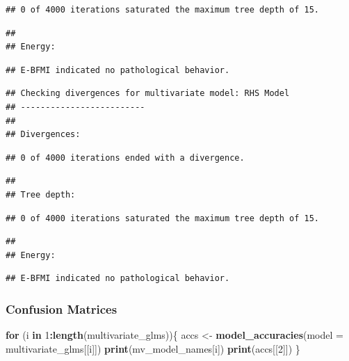 \documentclass[
]{article}
\newenvironment{Shaded}{\begin{snugshade}}{\end{snugshade}}
\newcommand{\ControlFlowTok}[1]{\textcolor[rgb]{0.13,0.29,0.53}{\textbf{#1}}}
\newcommand{\DataTypeTok}[1]{\textcolor[rgb]{0.13,0.29,0.53}{#1}}
\newcommand{\DecValTok}[1]{\textcolor[rgb]{0.00,0.00,0.81}{#1}}
\newcommand{\KeywordTok}[1]{\textcolor[rgb]{0.13,0.29,0.53}{\textbf{#1}}}
\newcommand{\NormalTok}[1]{#1}
\newcommand{\OperatorTok}[1]{\textcolor[rgb]{0.81,0.36,0.00}{\textbf{#1}}}
\newcommand{\StringTok}[1]{\textcolor[rgb]{0.31,0.60,0.02}{#1}}
\begin{document}
\begin{verbatim}
## 0 of 4000 iterations saturated the maximum tree depth of 15.
\end{verbatim}

\begin{verbatim}
## 
## Energy:
\end{verbatim}

\begin{verbatim}
## E-BFMI indicated no pathological behavior.
\end{verbatim}

\begin{verbatim}
## Checking divergences for multivariate model: RHS Model 
## -------------------------
## 
## Divergences:
\end{verbatim}

\begin{verbatim}
## 0 of 4000 iterations ended with a divergence.
\end{verbatim}

\begin{verbatim}
## 
## Tree depth:
\end{verbatim}

\begin{verbatim}
## 0 of 4000 iterations saturated the maximum tree depth of 15.
\end{verbatim}

\begin{verbatim}
## 
## Energy:
\end{verbatim}

\begin{verbatim}
## E-BFMI indicated no pathological behavior.
\end{verbatim}

\hypertarget{confusion-matrices}{%
\subsubsection{Confusion Matrices}\label{confusion-matrices}}

\begin{Shaded}
\begin{Highlighting}[]
\ControlFlowTok{for}\NormalTok{ (i }\ControlFlowTok{in} \DecValTok{1}\OperatorTok{:}\KeywordTok{length}\NormalTok{(multivariate_glms))\{}
\NormalTok{  accs <-}\StringTok{ }\KeywordTok{model_accuracies}\NormalTok{(}\DataTypeTok{model =}\NormalTok{ multivariate_glms[[i]])}
  \KeywordTok{print}\NormalTok{(mv_model_names[i])}
  \KeywordTok{print}\NormalTok{(accs[[}\DecValTok{2}\NormalTok{]])}
\NormalTok{\}}
\end{Highlighting}
\end{Shaded}
\end{document}
